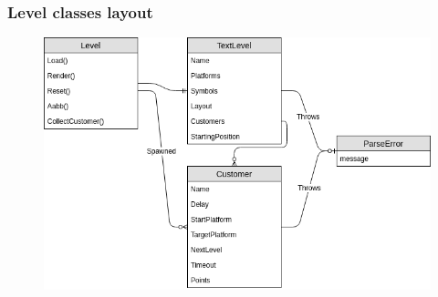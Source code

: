 \begin{frame}
    \frametitle{Level classes layout}
    \begin{figure}
      \begin{center}
        \includegraphics[height=0.7\textheight]{LevelUML.png}
      \end{center}
    \end{figure}
\end{frame}
